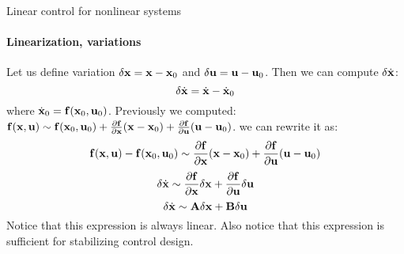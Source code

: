 \documentclass{beamer}
\begin{document}
\begin{frame}{Linear control for nonlinear systems}
	\framesubtitle{Linearization, variations}
	\begin{flushleft}
		
		Let us define variation $\delta \mathbf{x} = \mathbf{x} - \mathbf{x}_0$ and $\delta \mathbf{u} = \mathbf{u} - \mathbf{u}_0$. Then we can compute $\delta \dot{\mathbf{x}}$:
		\begin{equation}
		\delta \dot{\mathbf{x}} = 
		\dot{\mathbf{x}} - \dot{\mathbf{x}}_0
		\end{equation}		
		where $\dot{\mathbf{x}}_0 = \mathbf{f}(\mathbf{x}_0, \mathbf{u}_0)$. Previously we computed: $\mathbf{f}(\mathbf{x}, \mathbf{u}) 	\sim \mathbf{f}(\mathbf{x}_0, \mathbf{u}_0) +
		\frac{\partial \mathbf{f}}{\partial \mathbf{x}} (\mathbf{x} - \mathbf{x}_0) + 
		\frac{\partial \mathbf{f}}{\partial \mathbf{u}} (\mathbf{u} - \mathbf{u}_0)$. we can rewrite it as:
		\begin{equation}
	\mathbf{f}(\mathbf{x}, \mathbf{u}) - \mathbf{f}(\mathbf{x}_0, \mathbf{u}_0)	\sim 
	\frac{\partial \mathbf{f}}{\partial \mathbf{x}} (\mathbf{x} - \mathbf{x}_0) + 
	\frac{\partial \mathbf{f}}{\partial \mathbf{u}} (\mathbf{u} - \mathbf{u}_0)
		\end{equation}
	\begin{equation}
	\delta \dot{\mathbf{x}}	\sim 
	\frac{\partial \mathbf{f}}{\partial \mathbf{x}} \delta \mathbf{x} + 
	\frac{\partial \mathbf{f}}{\partial \mathbf{u}} \delta \mathbf{u}
	\end{equation}		
	\begin{equation}
	\delta \dot{\mathbf{x}}	\sim 
	\mathbf{A}  \delta \mathbf{x} + 
	\mathbf{B}  \delta \mathbf{u}
	\end{equation}
		Notice that this expression is always linear. Also notice that this expression is sufficient for stabilizing control design.
		
	\end{flushleft}
\end{frame}
\end{document}
